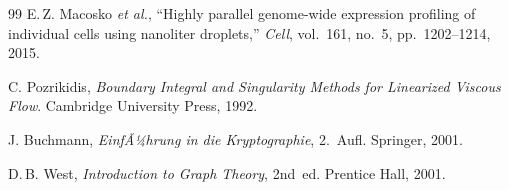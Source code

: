 ﻿\documentclass[a4paper,12pt]{scrreprt}
\theoremstyle{definition}
\begin{document}
\begin{thebibliography}{99}
 E.\,Z. Macosko \textit{et al.},
  ``Highly parallel genome-wide expression profiling of individual cells
  using nanoliter droplets,''
  \textit{Cell}, vol.~161, no.~5, pp.~1202--1214, 2015.

 C. Pozrikidis,
  \textit{Boundary Integral and Singularity Methods for Linearized
  Viscous Flow}.
  Cambridge University Press, 1992.

 J. Buchmann,
  \textit{EinfÃ¼hrung in die Kryptographie}, 2.~Aufl.
  Springer, 2001.

 D.\,B. West,
  \textit{Introduction to Graph Theory}, 2nd~ed.
  Prentice Hall, 2001.
\end{thebibliography}
\endgroup
\end{document}
